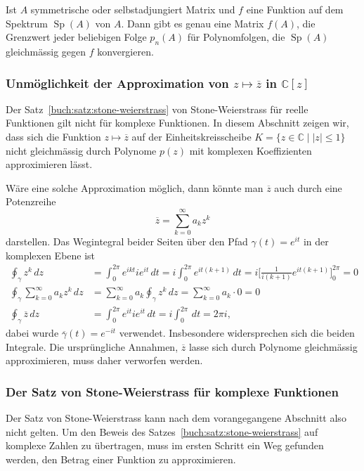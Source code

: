 \begin{satz}
\label{buch:eigenwerte:satz:spektralsatz}
Ist $A$ symmetrische oder selbstadjungiert Matrix und $f$ eine Funktion
auf dem Spektrum $\operatorname{Sp}(A)$ von $A$.
Dann gibt es genau eine Matrix $f(A)$, die Grenzwert jeder beliebigen
Folge $p_n(A)$ für Polynomfolgen, die $\operatorname{Sp}(A)$ gleichmässig
gegen $f$ konvergieren.
\end{satz}

\subsubsection{Unmöglichkeit der Approximation von $z\mapsto \overline{z}$
in $\mathbb{C}[z]$}
Der Satz~\ref{buch:satz:stone-weierstrass} von Stone-Weierstrass für
reelle Funktionen gilt nicht für komplexe Funktionen.
In diesem Abschnitt zeigen wir, dass sich die Funktion $z\mapsto\overline{z}$
auf der Einheitskreisscheibe $K=\{z\in\mathbb{C}\;|\; |z|\le 1\}$ nicht
gleichmässig durch Polynome $p(z)$ mit komplexen Koeffizienten approximieren
lässt.

Wäre eine solche Approximation möglich, dann könnte man $\overline{z}$
auch durch eine Potenzreihe
\[
\overline{z}
=
\sum_{k=0}^\infty a_kz^k
\]
darstellen.
Das Wegintegral beider Seiten über den Pfad $\gamma(t) = e^{it}$
in der komplexen Ebene ist
\begin{align*}
\oint_\gamma z^k\,dz
&=
\int_0^{2\pi} e^{ikt} ie^{it}\,dt
=
i\int_0^{2\pi} e^{it(k+1)}\,dt
=
i\biggl[ \frac{1}{i(k+1)} e^{it(k+1)}\biggr]_0^{2\pi}
=
0
\\
\oint_\gamma
\sum_{k=0}^\infty a_kz^k
\,dz
&=
\sum_{k=0}^\infty a_k \oint_\gamma z^k\,dz
=
\sum_{k=0}^\infty a_k\cdot 0
=
0
\\
\oint_\gamma \overline{z}\,dz
&=
\int_0^{2\pi} e^{it} ie^{it}\,dt
=
i\int_0^{2\pi} \,dt = 2\pi i,
\end{align*}
dabei wurde $\overline{\gamma}(t)=e^{-it}$ verwendet.
Insbesondere widersprechen sich die beiden Integrale.
Die ursprüngliche Annahmen, $\overline{z}$ lasse sich durch Polynome
gleichmässig approximieren, muss daher verworfen werden.

\subsubsection{Der Satz von Stone-Weierstrass für komplexe Funktionen}
Der Satz von Stone-Weierstrass kann nach dem vorangegangene Abschnitt
also nicht gelten.
Um den Beweis des Satzes~\ref{buch:satz:stone-weierstrass}
auf komplexe Zahlen zu übertragen, muss im ersten Schritt ein Weg
gefunden werden, den Betrag einer Funktion zu approximieren.

